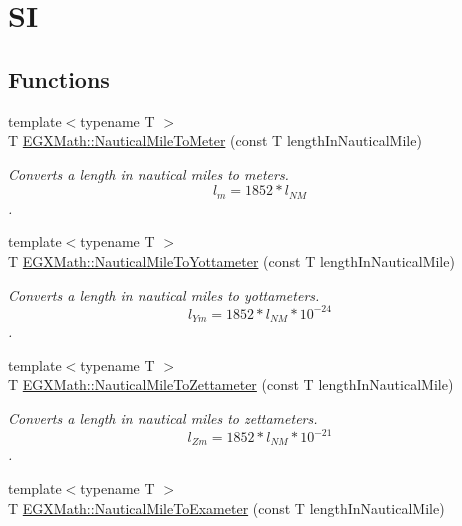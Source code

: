 \hypertarget{group___e_g_x_math-_conversions-_length_conversions-_nautical-_nautical_mile-_s_i}{}\section{SI}
\label{group___e_g_x_math-_conversions-_length_conversions-_nautical-_nautical_mile-_s_i}
\subsection*{Functions}
\begin{DoxyCompactItemize}
\item 
{\footnotesize template$<$typename T $>$ }\\T \mbox{\hyperlink{group___e_g_x_math-_conversions-_length_conversions-_nautical-_nautical_mile-_s_i_ga828e054a1ecb313ed21e6f581110b164}{E\+G\+X\+Math\+::\+Nautical\+Mile\+To\+Meter}} (const T length\+In\+Nautical\+Mile)
\begin{DoxyCompactList}\small\item\em Converts a length in nautical miles to meters. \[ l_{m}=1852 * l_{NM} \]. \end{DoxyCompactList}\item 
{\footnotesize template$<$typename T $>$ }\\T \mbox{\hyperlink{group___e_g_x_math-_conversions-_length_conversions-_nautical-_nautical_mile-_s_i_gaae1116911eff729d693728d7757ac6eb}{E\+G\+X\+Math\+::\+Nautical\+Mile\+To\+Yottameter}} (const T length\+In\+Nautical\+Mile)
\begin{DoxyCompactList}\small\item\em Converts a length in nautical miles to yottameters. \[ l_{Ym}=1852 * l_{NM} * 10^{-24} \]. \end{DoxyCompactList}\item 
{\footnotesize template$<$typename T $>$ }\\T \mbox{\hyperlink{group___e_g_x_math-_conversions-_length_conversions-_nautical-_nautical_mile-_s_i_ga3526b4110d429ac9e322baaa4c088e2b}{E\+G\+X\+Math\+::\+Nautical\+Mile\+To\+Zettameter}} (const T length\+In\+Nautical\+Mile)
\begin{DoxyCompactList}\small\item\em Converts a length in nautical miles to zettameters. \[ l_{Zm}=1852 * l_{NM} * 10^{-21} \]. \end{DoxyCompactList}\item 
{\footnotesize template$<$typename T $>$ }\\T \mbox{\hyperlink{group___e_g_x_math-_conversions-_length_conversions-_nautical-_nautical_mile-_s_i_ga1b24e221d09b49c54d546eb1124e9894}{E\+G\+X\+Math\+::\+Nautical\+Mile\+To\+Exameter}} (const T length\+In\+Nautical\+Mile)

\end{DoxyCompactItemize}
